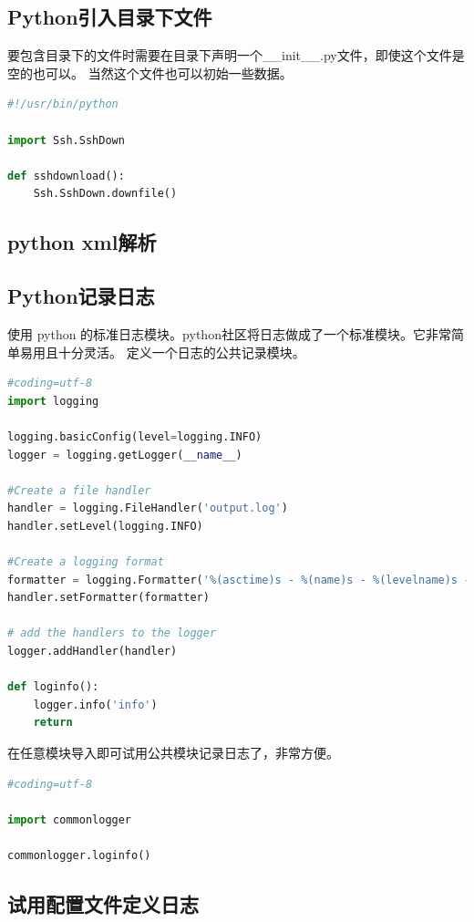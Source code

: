 \documentclass{book}
\begin{document}
\subsection{Python引入目录下文件}

要包含目录下的文件时需要在目录下声明一个\_\_init\_\_.py文件，即使这个文件是空的也可以。
当然这个文件也可以初始一些数据。

\begin{lstlisting}[language=Python]
#!/usr/bin/python

import Ssh.SshDown

def sshdownload():
	Ssh.SshDown.downfile()
\end{lstlisting}

\subsection{python xml解析}

\subsection{Python记录日志}

使用 python 的标准日志模块。python社区将日志做成了一个标准模块。它非常简单易用且十分灵活。
定义一个日志的公共记录模块。

\begin{lstlisting}[language=Python]
#coding=utf-8
import logging

logging.basicConfig(level=logging.INFO)
logger = logging.getLogger(__name__)

#Create a file handler
handler = logging.FileHandler('output.log')
handler.setLevel(logging.INFO)

#Create a logging format
formatter = logging.Formatter('%(asctime)s - %(name)s - %(levelname)s - %(message)s')
handler.setFormatter(formatter)

# add the handlers to the logger
logger.addHandler(handler)

def loginfo():
    logger.info('info')
    return
\end{lstlisting}

在任意模块导入即可试用公共模块记录日志了，非常方便。

\begin{lstlisting}[language=Python]
#coding=utf-8

import commonlogger

commonlogger.loginfo()
\end{lstlisting}

\subsection{试用配置文件定义日志}
\end{document}
